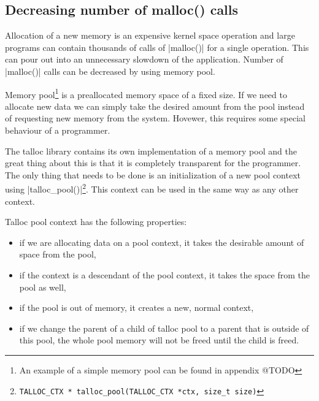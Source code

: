 \subsection{Decreasing number of malloc() calls}
\label{talloc:subsec:pool}


Allocation of a new memory is an expensive kernel space operation and large
programs can contain thousands of calls of |malloc()| for a single operation.
This can pour out into an unnecessary slowdown of the application. Number of
|malloc()| calls can be decreased by using memory pool.

Memory pool\footnote{An example of a simple memory pool can be found in appendix
@TODO} is a preallocated memory space of a fixed size. If we need to allocate
new data we can simply take the desired amount from the pool instead of
requesting new memory from the system. Hovewer, this requires some special
behaviour of a programmer.

The talloc library contains its own implementation of a memory pool and the
great thing about this is that it is completely transparent for the programmer.
The only thing that needs to be done is an initialization of a new pool context
using |talloc_pool()|\footnote{\lstinline{TALLOC_CTX *
talloc_pool(TALLOC_CTX *ctx, size_t size)}}. This context can be used in the
same way as any other context.

Talloc pool context has the following properties:

\begin{itemize}
  \item if we are allocating data on a pool context, it takes the  desirable
  amount of space from the pool,
  \item if the context is a descendant of the pool context, it takes the space
  from the pool as well,
  \item if the pool is out of memory, it creates a new, normal context,
  \item if we change the parent of a child of talloc pool to a parent that is
  outside of this pool, the whole pool memory will not be freed until the child
  is freed.
\end{itemize}

